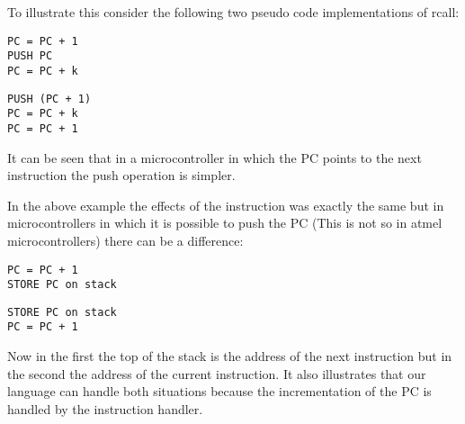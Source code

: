 To illustrate this consider the following two pseudo code
implementations of rcall:

\lstset{caption=PC points to next instruction}
\begin{lstlisting}
PC = PC + 1
PUSH PC
PC = PC + k
\end{lstlisting}

\lstset{caption=PC points to current instruction}
\begin{lstlisting}
PUSH (PC + 1)
PC = PC + k
PC = PC + 1
\end{lstlisting}

It can be seen that in a microcontroller in which the PC points to the
next instruction the push operation is simpler.

In the above example the effects of the instruction was exactly the same
but in microcontrollers in which it is possible to push the PC (This
is not so in atmel microcontrollers) there can be a difference:

\lstset{caption=PC points to next instruction}
\begin{lstlisting}
PC = PC + 1
STORE PC on stack
\end{lstlisting}

\lstset{caption=PC points to current instruction}
\begin{lstlisting}
STORE PC on stack
PC = PC + 1
\end{lstlisting}

Now in the first the top of the stack is the address of the next
instruction but in the second the address of the current instruction.
It also illustrates that our language can handle both situations
because the incrementation of the PC is handled by the instruction
handler.
